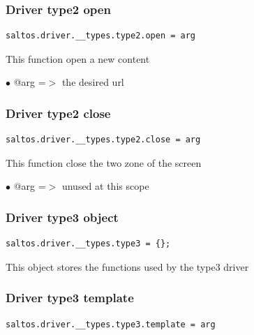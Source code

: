 \documentclass[a4paper]{article}
\begin{document}
\hypertarget{toc190}{}
\subsubsection{Driver type2 open}

\begin{lstlisting}
saltos.driver.__types.type2.open = arg
\end{lstlisting}

This function open a new content

\begin{compactitem}
\item[\color{myblue}$\bullet$] @arg =$>$ the desired url
\end{compactitem}

\hypertarget{toc191}{}
\subsubsection{Driver type2 close}

\begin{lstlisting}
saltos.driver.__types.type2.close = arg
\end{lstlisting}

This function close the two zone of the screen

\begin{compactitem}
\item[\color{myblue}$\bullet$] @arg =$>$ unused at this scope
\end{compactitem}

\hypertarget{toc192}{}
\subsubsection{Driver type3 object}

\begin{lstlisting}
saltos.driver.__types.type3 = {};
\end{lstlisting}

This object stores the functions used by the type3 driver

\hypertarget{toc193}{}
\subsubsection{Driver type3 template}

\begin{lstlisting}
saltos.driver.__types.type3.template = arg
\end{lstlisting}
\end{document}
